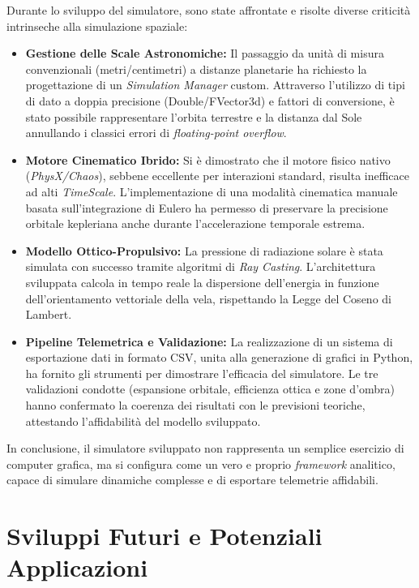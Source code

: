 Durante lo sviluppo del simulatore, sono state affrontate e risolte diverse criticità intrinseche alla simulazione spaziale:
\begin{itemize}
    \item \textbf{Gestione delle Scale Astronomiche:} Il passaggio da unità di misura convenzionali (metri/centimetri) a distanze planetarie ha richiesto la progettazione di un \textit{Simulation Manager} custom. Attraverso l'utilizzo di tipi di dato a doppia precisione (Double/FVector3d) e fattori di conversione, è stato possibile rappresentare l'orbita terrestre e la distanza dal Sole annullando i classici errori di \textit{floating-point overflow}.
    \item \textbf{Motore Cinematico Ibrido:} Si è dimostrato che il motore fisico nativo (\textit{PhysX/Chaos}), sebbene eccellente per interazioni standard, risulta inefficace ad alti \textit{TimeScale}. L'implementazione di una modalità cinematica manuale basata sull'integrazione di Eulero ha permesso di preservare la precisione orbitale kepleriana anche durante l'accelerazione temporale estrema.
    \item \textbf{Modello Ottico-Propulsivo:} La pressione di radiazione solare è stata simulata con successo tramite algoritmi di \textit{Ray Casting}. L'architettura sviluppata calcola in tempo reale la dispersione dell'energia in funzione dell'orientamento vettoriale della vela, rispettando la Legge del Coseno di Lambert.
    \item \textbf{Pipeline Telemetrica e Validazione:} La realizzazione di un sistema di esportazione dati in formato CSV, unita alla generazione di grafici in Python, ha fornito gli strumenti per dimostrare l'efficacia del simulatore. Le tre validazioni condotte (espansione orbitale, efficienza ottica e zone d'ombra) hanno confermato la coerenza dei risultati con le previsioni teoriche, attestando l'affidabilità del modello sviluppato.
\end{itemize}

In conclusione, il simulatore sviluppato non rappresenta un semplice esercizio di computer grafica, ma si configura come un vero e proprio \textit{framework} analitico, capace di simulare dinamiche complesse e di esportare telemetrie affidabili.


\section{Sviluppi Futuri e Potenziali Applicazioni}

